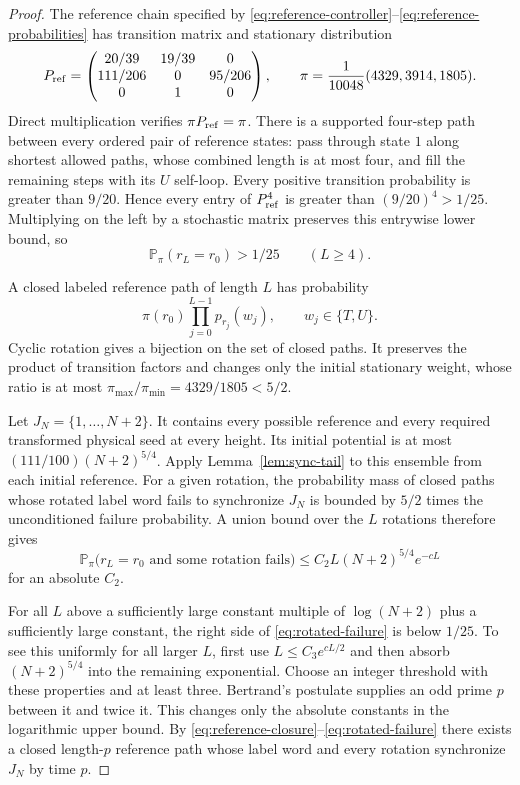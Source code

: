 \begin{proof}
The reference chain specified by
\eqref{eq:reference-controller}--\eqref{eq:reference-probabilities}
has transition matrix and stationary distribution
\[
 P_{\rm ref}=
 \begin{pmatrix}
 20/39&19/39&0\\
 111/206&0&95/206\\
 0&1&0
 \end{pmatrix},\qquad
 \pi=\frac1{10048}(4329,3914,1805).
\]
Direct multiplication verifies $\pi P_{\rm ref}=\pi$.
There is a supported four-step path between every ordered pair
of reference states: pass through state $1$ along shortest
allowed paths, whose combined length is at most four, and fill
the remaining steps with its $U$ self-loop. Every positive
transition probability is greater than $9/20$. Hence every
entry of $P_{\rm ref}^4$ is greater than
$(9/20)^4>1/25$. Multiplying on the left by a stochastic matrix
preserves this entrywise lower bound, so
\begin{equation}\label{eq:reference-closure}
 \mathbb P_\pi(r_L=r_0)>1/25\qquad(L\ge4).
\end{equation}

A closed labeled reference path of length $L$ has probability
\[
 \pi(r_0)\prod_{j=0}^{L-1}p_{r_j}(w_j),
 \qquad w_j\in\{T,U\}.
\]
Cyclic rotation gives a bijection on the set of closed paths.
It preserves the product of transition factors and changes only
the initial stationary weight, whose ratio is at most
$\pi_{\max}/\pi_{\min}=4329/1805<5/2$.

Let $J_N=\{1,\ldots,N+2\}$. It contains every possible reference
and every required transformed physical seed at every height.
Its initial potential is at most
$(111/100)(N+2)^{5/4}$. Apply
Lemma~\ref{lem:sync-tail} to this ensemble from each initial
reference. For a given rotation, the probability mass of closed
paths whose rotated label word fails to synchronize $J_N$ is
bounded by $5/2$ times the unconditioned failure probability.
A union bound over the $L$ rotations therefore gives
\begin{equation}\label{eq:rotated-failure}
 \mathbb P_\pi\bigl(r_L=r_0\text{ and some rotation fails}\bigr)
 \le C_2 L(N+2)^{5/4}e^{-cL}
\end{equation}
for an absolute $C_2$.

For all $L$ above a sufficiently large constant multiple of
$\log(N+2)$ plus a sufficiently large constant, the right side
of \eqref{eq:rotated-failure} is below $1/25$. To see this
uniformly for all larger $L$, first use
$L\le C_3e^{cL/2}$ and then absorb $(N+2)^{5/4}$ into the
remaining exponential. Choose an integer threshold with these
properties and at least three. Bertrand's postulate supplies an
odd prime $p$ between it and twice it. This changes only the
absolute constants in the logarithmic upper bound.
By \eqref{eq:reference-closure}--\eqref{eq:rotated-failure}
there exists a closed length-$p$ reference path whose label word
and every rotation synchronize $J_N$ by time $p$.


\end{proof}
